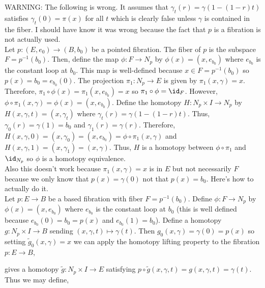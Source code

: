 \documentclass[12pt]{extarticle}
\begin{document}
WARNING: The following is wrong. It assumes that $\gamma_t(r) = \gamma(1 - (1 - r) t)$ satisfies $\gamma_t(0) = \pi(x)$ for all $t$ which is clearly false unless $\gamma$ is contained in the fiber. I should have know it was wrong because the fact that $p$ is a fibration is not actually used.
\bigskip\\
Let $p : (E, e_0) \to (B, b_0)$ be a pointed fibration. The fiber of $p$ is the subspace $F = p^{-1}(b_0)$. Then, define the map $\phi : F \to N_p$ by $\phi(x) = (x, e_{b_0})$ where $e_{b_0}$ is the constant loop at $b_0$. This map is well-defined because $x \in F = p^{-1}(b_0)$ so $p(x) = b_0 = e_{b_0}(0)$. The projection $\pi_1 : N_p \to E$ is given by $\pi_1(x, \gamma) = x$. Therefore, $\pi_1 \circ \phi(x) = \pi_1(x, e_{b_0}) = x$ so $\pi_1 \circ \phi = \id_F$. However, $\phi \circ \pi_1(x, \gamma) = \phi(x) = (x, e_{b_0})$. Define the homotopy $H : N_p \times I \to N_p$ by $H(x, \gamma, t) = (x, \gamma_t)$ where $\gamma_t(r) = \gamma(1 - (1 - r) t)$. Thus, $\gamma_0(r) = \gamma(1) = b_0$ and $\gamma_1(r) = \gamma(r)$. Therefore, $H(x, \gamma, 0) = (x, \gamma_0) = (x, e_{b_0}) = \phi \circ \pi_1(x, \gamma)$ and $H(x, \gamma, 1) = (x, \gamma_1) = (x, \gamma)$. Thus, $H$ is a homotopy between $\phi \circ \pi_1$ and $\id_{N_p}$ so $\phi$ is a homotopy equivalence. 
\bigskip\\
Also this doesn't work because $\pi_1(x, \gamma) = x$ is in $E$ but not necessarily $F$ because we only know that $p(x) = \gamma(0)$ not that $p(x) = b_0$. Here's how to actually do it.
\bigskip\\
Let $p : E \to B$ be a based fibration with fiber $F = p^{-1}(b_0)$. Define $\phi : F \to N_p$ by $\phi(x) = (x, e_{b_0})$ where $e_{b_0}$ is the constant loop at $b_0$ (this is well defined because $e_{b_0}(0) = b_0 = p(x)$ and $e_{b_0}(1) = b_0$).
Define a homotopy $g : N_p \times I \to B$ sending $(x, \gamma, t) \mapsto \gamma(t)$. Then $g_0(x, \gamma) = \gamma(0) = p(x)$ so setting $\tilde{g}_0(x, \gamma) = x$ we can apply the homotopy lifting property to the fibration $p : E \to B$,
\begin{center}
\end{center}
gives a homotopy $\tilde{g} : N_p \times I \to E$ satisfying $p \circ \tilde{g}(x, \gamma, t) = g(x, \gamma, t) = \gamma(t)$. Thus we may define,
\end{document}
